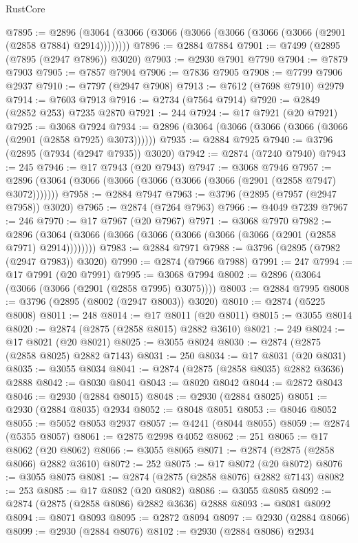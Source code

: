 \begin{lexlean}{RustCore}
\begin{coremodule}
@7895 := @2896 (@3064 (@3066 (@3066 (@3066 (@3066 (@3066 (@3066 (@2901 (@2858 @7884) @2914))))))))
@7896 := @2884 @7884
@7901 := @7499 (@2895 (@7895 (@2947 @7896)) @3020)
@7903 := @2930 @7901 @7790
@7904 := @7879 @7903
@7905 := @7857 @7904
@7906 := @7836 @7905
@7908 := @7799 @7906 @2937
@7910 := @7797 (@2947 @7908)
@7913 := @7612 (@7698 @7910) @2979
@7914 := @7603 @7913
@7916 := @2734 (@7564 @7914)
@7920 := @2849 (@2852 @253) @7235 @2870
@7921 := 244
@7924 := @17 @7921 (@20 @7921)
@7925 := @3068 @7924
@7934 := @2896 (@3064 (@3066 (@3066 (@3066 (@3066 (@2901 (@2858 @7925) @3073))))))
@7935 := @2884 @7925
@7940 := @3796 (@2895 (@7934 (@2947 @7935)) @3020)
@7942 := @2874 (@7240 @7940)
@7943 := 245
@7946 := @17 @7943 (@20 @7943)
@7947 := @3068 @7946
@7957 := @2896 (@3064 (@3066 (@3066 (@3066 (@3066 (@3066 (@2901 (@2858 @7947) @3072)))))))
@7958 := @2884 @7947
@7963 := @3796 (@2895 (@7957 (@2947 @7958)) @3020)
@7965 := @2874 (@7264 @7963)
@7966 := @4049 @7239
@7967 := 246
@7970 := @17 @7967 (@20 @7967)
@7971 := @3068 @7970
@7982 := @2896 (@3064 (@3066 (@3066 (@3066 (@3066 (@3066 (@3066 (@2901 (@2858 @7971) @2914))))))))
@7983 := @2884 @7971
@7988 := @3796 (@2895 (@7982 (@2947 @7983)) @3020)
@7990 := @2874 (@7966 @7988)
@7991 := 247
@7994 := @17 @7991 (@20 @7991)
@7995 := @3068 @7994
@8002 := @2896 (@3064 (@3066 (@3066 (@2901 (@2858 @7995) @3075))))
@8003 := @2884 @7995
@8008 := @3796 (@2895 (@8002 (@2947 @8003)) @3020)
@8010 := @2874 (@5225 @8008)
@8011 := 248
@8014 := @17 @8011 (@20 @8011)
@8015 := @3055 @8014
@8020 := @2874 (@2875 (@2858 @8015) @2882 @3610)
@8021 := 249
@8024 := @17 @8021 (@20 @8021)
@8025 := @3055 @8024
@8030 := @2874 (@2875 (@2858 @8025) @2882 @7143)
@8031 := 250
@8034 := @17 @8031 (@20 @8031)
@8035 := @3055 @8034
@8041 := @2874 (@2875 (@2858 @8035) @2882 @3636) @2888
@8042 := @8030 @8041
@8043 := @8020 @8042
@8044 := @2872 @8043
@8046 := @2930 (@2884 @8015)
@8048 := @2930 (@2884 @8025)
@8051 := @2930 (@2884 @8035) @2934
@8052 := @8048 @8051
@8053 := @8046 @8052
@8055 := @5052 @8053 @2937
@8057 := @4241 (@8044 @8055)
@8059 := @2874 (@5355 @8057)
@8061 := @2875 @2998 @4052
@8062 := 251
@8065 := @17 @8062 (@20 @8062)
@8066 := @3055 @8065
@8071 := @2874 (@2875 (@2858 @8066) @2882 @3610)
@8072 := 252
@8075 := @17 @8072 (@20 @8072)
@8076 := @3055 @8075
@8081 := @2874 (@2875 (@2858 @8076) @2882 @7143)
@8082 := 253
@8085 := @17 @8082 (@20 @8082)
@8086 := @3055 @8085
@8092 := @2874 (@2875 (@2858 @8086) @2882 @3636) @2888
@8093 := @8081 @8092
@8094 := @8071 @8093
@8095 := @2872 @8094
@8097 := @2930 (@2884 @8066)
@8099 := @2930 (@2884 @8076)
@8102 := @2930 (@2884 @8086) @2934

\end{coremodule}
\end{lexlean}
